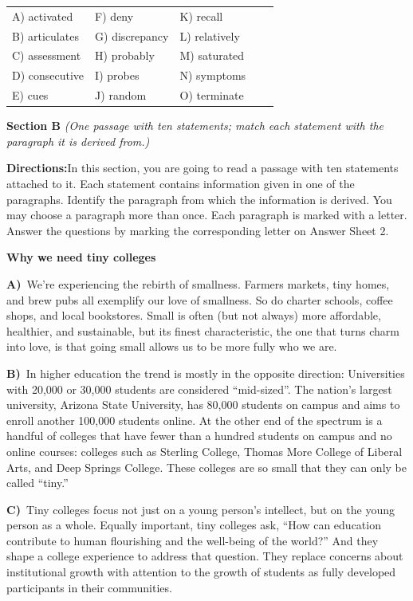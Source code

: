 \medskip
\begin{center}\small
\begin{tabular}{lllll}
A) activated & F) deny & K) recall \\
B) articulates & G) discrepancy & L) relatively \\
C) assessment & H) probably & M) saturated \\
D) consecutive & I) probes & N) symptoms \\
E) cues & J) random & O) terminate \\
\end{tabular}
\end{center}
\bigskip
\noindent\textbf{Section B}\quad
\noindent\textit{(One passage with ten statements; match each statement with the paragraph it is derived from.)}\par
\medskip
\noindent\textbf{Directions:}\quad In this section, you are going to read a passage with ten statements attached to it. Each statement contains information given in one of the paragraphs. Identify the paragraph from which the information is derived. You may choose a paragraph more than once. Each paragraph is marked with a letter. Answer the questions by marking the corresponding letter on Answer Sheet 2.\par
\medskip
\noindent\textbf{\large Why we need tiny colleges}\par
\medskip
\noindent\textbf{A)}\ We're experiencing the rebirth of smallness. Farmers markets, tiny homes, and brew pubs all exemplify our love of smallness. So do charter schools, coffee shops, and local bookstores. Small is often (but not always) more affordable, healthier, and sustainable, but its finest characteristic, the one that turns charm into love, is that going small allows us to be more fully who we are.\par
\smallskip
\noindent\textbf{B)}\ In higher education the trend is mostly in the opposite direction: Universities with 20,000 or 30,000 students are considered ``mid-sized''. The nation's largest university, Arizona State University, has 80,000 students on campus and aims to enroll another 100,000 students online. At the other end of the spectrum is a handful of colleges that have fewer than a hundred students on campus and no online courses: colleges such as Sterling College, Thomas More College of Liberal Arts, and Deep Springs College. These colleges are so small that they can only be called ``tiny.''\par
\smallskip
\noindent\textbf{C)}\ Tiny colleges focus not just on a young person's intellect, but on the young person as a whole. Equally important, tiny colleges ask, ``How can education contribute to human flourishing and the well-being of the world?'' And they shape a college experience to address that question. They replace concerns about institutional growth with attention to the growth of students as fully developed participants in their communities.\par
